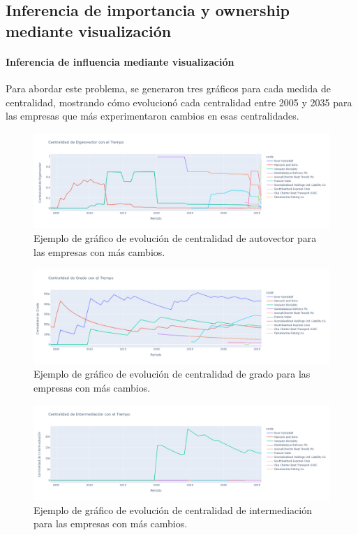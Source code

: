 \documentclass[11pt,spanish,a4paper]{article}
\begin{document}
\subsection{Inferencia de importancia y ownership mediante visualización}

\paragraph{Inferencia de influencia mediante visualización}
Para abordar este problema, se generaron tres gráficos para cada medida de centralidad, mostrando cómo evolucionó cada centralidad entre 2005 y 2035 para las empresas que más experimentaron cambios en esas centralidades.

\begin{figure}[H]
  \centering
  \includegraphics[width=0.7\linewidth]{graphs/eigenvector_centralidad_tiempo.png}
  \caption{Ejemplo de gráfico de evolución de centralidad de autovector para las empresas con más cambios.}
\end{figure}

\begin{figure}[H]
  \centering
  \includegraphics[width=0.7\linewidth]{graphs/grado_centralidad_tiempo.png}
  \caption{Ejemplo de gráfico de evolución de centralidad de grado para las empresas con más cambios.}
\end{figure}

\begin{figure}[H]
  \centering
  \includegraphics[width=0.7\linewidth]{graphs/between_centralidad_tiempo.png}
  \caption{Ejemplo de gráfico de evolución de centralidad de intermediación para las empresas con más cambios.}
\end{figure}
\end{document}
